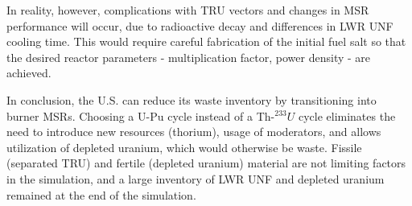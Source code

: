 In reality, however, complications with \gls{TRU} vectors and changes in \gls{MSR}
performance will occur, due to radioactive decay and differences in \gls{LWR} \gls{UNF}
cooling time. This would require careful fabrication of the initial fuel salt
so that the desired reactor parameters - multiplication factor, power density - are achieved.

In conclusion, the U.S. can reduce its waste inventory by transitioning into
burner \glspl{MSR}. Choosing a U-Pu cycle instead of a Th-$^{233}U$ cycle
eliminates the need to introduce new resources (thorium), usage of moderators,
and allows utilization of depleted uranium, which would otherwise be waste.
Fissile (separated \gls{TRU}) and fertile (depleted uranium) material are
not limiting factors in the simulation, and a large inventory of \gls{LWR} \gls{UNF}
and depleted uranium remained at the end of the simulation.